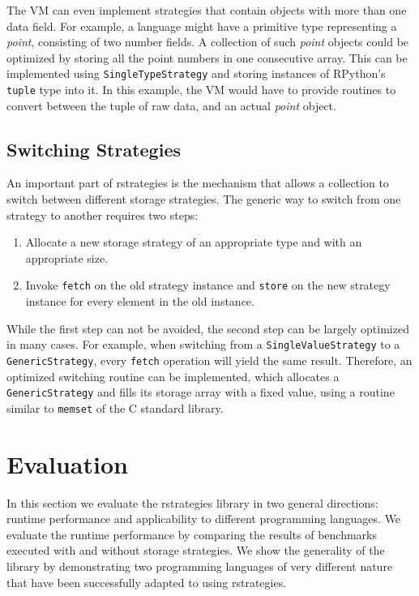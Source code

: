 \documentclass[english,10pt]{sigplanconf}
\begin{document}
The VM can even implement strategies that contain objects with more
than one data field.  For example, a language might have a primitive
type representing a \emph{point}, consisting of two number fields.  A
collection of such \emph{point} objects could be optimized by storing
all the point numbers in one consecutive array.  This can be
implemented using \lstinline{SingleTypeStrategy} and storing instances
of RPython's \lstinline{tuple} type into it.  In this example, the VM
would have to provide routines to convert between the tuple of raw
data, and an actual \emph{point} object.


\subsection{Switching Strategies}
\label{sec:switching}

An important part of rstrategies is the mechanism that allows a collection to
switch between different storage strategies. The generic way to switch from one
strategy to another requires two steps:
%
\begin{enumerate}
\item Allocate a new storage strategy of an appropriate type and with an
  appropriate size.
\item Invoke \lstinline{fetch} on the old strategy instance and
  \lstinline{store} on the new strategy instance for every element in the old
  instance.
\end{enumerate}
%
While the first step can not be avoided, the second step can be
largely optimized in many cases.  For example, when switching from a
\lstinline{SingleValueStrategy} to a \lstinline{GenericStrategy},
every \lstinline{fetch} operation will yield the same result.
Therefore, an optimized switching routine can be implemented, which
allocates a \lstinline{GenericStrategy} and fills its storage array
with a fixed value, using a routine similar to \lstinline{memset} of
the C standard library.

\section{Evaluation}

In this section we evaluate the rstrategies library in two general
directions: runtime performance and applicability to different
programming languages.  We evaluate the runtime performance by
comparing the results of benchmarks executed with and without storage
strategies.  We show the generality of the library by demonstrating
two programming languages of very different nature that have been
successfully adapted to using rstrategies.
\end{document}
